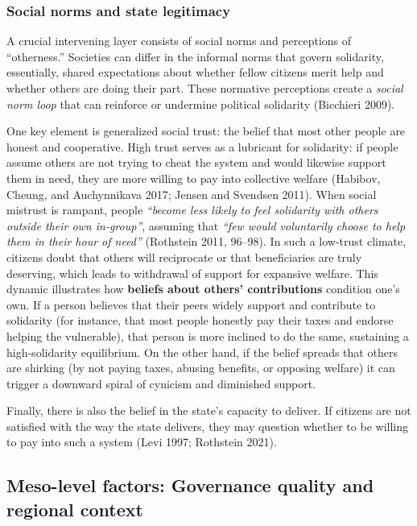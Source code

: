 \documentclass[12pt]{article}
\begin{document}
\subsubsection{Social norms and state
legitimacy}\label{social-norms-and-state-legitimacy}

A crucial intervening layer consists of social norms and perceptions of
``otherness.'' Societies can differ in the informal norms that govern
solidarity, essentially, shared expectations about whether fellow
citizens merit help and whether others are doing their part. These
normative perceptions create a \emph{social norm loop} that can
reinforce or undermine political solidarity (Bicchieri 2009).

One key element is generalized social trust: the belief that most other
people are honest and cooperative. High trust serves as a lubricant for
solidarity: if people assume others are not trying to cheat the system
and would likewise support them in need, they are more willing to pay
into collective welfare (Habibov, Cheung, and Auchynnikava 2017; Jensen
and Svendsen 2011). When social mistrust is rampant, people
\emph{``become less likely to feel solidarity with others outside their
own in-group''}, assuming that \emph{``few would voluntarily choose to
help them in their hour of need''} (Rothstein 2011, 96--98). In such a
low-trust climate, citizens doubt that others will reciprocate or that
beneficiaries are truly deserving, which leads to withdrawal of support
for expansive welfare. This dynamic illustrates how \textbf{beliefs
about others' contributions} condition one's own. If a person believes
that their peers widely support and contribute to solidarity (for
instance, that most people honestly pay their taxes and endorse helping
the vulnerable), that person is more inclined to do the same, sustaining
a high-solidarity equilibrium. On the other hand, if the belief spreads
that others are shirking (by not paying taxes, abusing benefits, or
opposing welfare) it can trigger a downward spiral of cynicism and
diminished support.

Finally, there is also the belief in the state's capacity to deliver. If
citizens are not satisfied with the way the state delivers, they may
question whether to be willing to pay into such a system (Levi 1997;
Rothstein 2021).

\subsection{Meso-level factors: Governance quality and regional
context}\label{meso-level-factors-governance-quality-and-regional-context}
\end{document}
